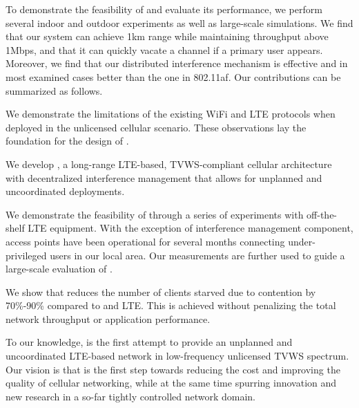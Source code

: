 To demonstrate the feasibility of \cf and evaluate its performance, 
we perform several indoor and outdoor experiments as well as large-scale simulations. 
We find that our system can achieve 1km range while maintaining throughput above 1Mbps, and that it can quickly vacate a channel if a primary user appears. 
Moreover, we find that our distributed interference mechanism is effective and in most examined cases better than the one in 802.11af. 
Our contributions can be summarized as follows. 



\begin{sitemize}
\item We demonstrate the limitations
    of the existing WiFi and LTE protocols when deployed in the unlicensed
  cellular scenario. These observations lay the foundation for the  design of \cf.  
\item We develop \cf, a long-range LTE-based, TVWS-compliant cellular architecture with decentralized interference management that allows for unplanned and uncoordinated deployments. 
\item We demonstrate the feasibility of \cf through a series of experiments with off-the-shelf LTE equipment. 
With the exception of interference management component, \cf access points have been operational for several 
months connecting under-privileged users in our local area. Our measurements are further used to guide a large-scale evaluation of \cf. 
\item We show that \cf reduces the number of clients starved due to contention  by 70\%-90\% compared to \wf and LTE. This is achieved without penalizing the total network throughput or application performance.
\end{sitemize}

To our knowledge, \cf is the first attempt to provide an unplanned and uncoordinated LTE-based network in low-frequency unlicensed TVWS spectrum.
Our vision is that \cf is the first step towards reducing the cost and improving the quality of cellular networking, 
while at the same time spurring innovation and new research in a so-far tightly controlled network domain. 



